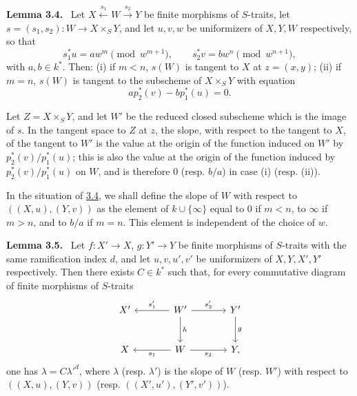 \documentclass[11pt]{article}
\newenvironment{statement}[1]{\par\medskip\noindent\textbf{#1.}\ }{\par\medskip}
\begin{document}
\label{sga5:IIIB:lemma:3.4}\begin{statement}{Lemma 3.4}
Let $X\xleftarrow{s_1}W\xrightarrow{s_2}Y$ be finite morphisms of $S$-traits, let $s=(s_1,s_2):W\to X\times_SY$, and let $u,v,w$ be uniformizers of $X,Y,W$ respectively, so that
\[
s_1^*u=aw^m\pmod {w^{m+1}},\qquad
s_2^*v=bw^n\pmod {w^{n+1}},
\]
with $a,b\in k^*$. Then: (i) if $m<n$, $s(W)$ is tangent to $X$ at $z=(x,y)$; (ii) if $m=n$, $s(W)$ is tangent to the subscheme of $X\times_SY$ with equation
\[
ap_2^*(v)-bp_1^*(u)=0.
\]
\end{statement}

Let $Z=X\times_SY$, and let $W'$ be the reduced closed subscheme which is the image of $s$. In the tangent space to $Z$ at $z$, the slope, with respect to the tangent to $X$, of the tangent to $W'$ is the value at the origin of the function induced on $W'$ by $p_2^*(v)/p_1^*(u)$; this is also the value at the origin of the function induced by $p_2^*(v)/p_1^*(u)$ on $W$, and is therefore $0$ (resp. $b/a$) in case (i) (resp. (ii)).

In the situation of \hyperref[sga5:IIIB:lemma:3.4]{3.4}, we shall define the slope of $W$ with respect to $((X,u),(Y,v))$ as the element of $k\cup\{\infty\}$ equal to $0$ if $m<n$, to $\infty$ if $m>n$, and to $b/a$ if $m=n$. This element is independent of the choice of $w$.

\label{sga5:IIIB:lemma:3.5}\begin{statement}{Lemma 3.5}
Let $f:X'\to X$, $g:Y'\to Y$ be finite morphisms of $S$-traits with the same ramification index $d$, and let $u,v,u',v'$ be uniformizers of $X,Y,X',Y'$ respectively. Then there exists $C\in k^*$ such that, for every commutative diagram of finite morphisms of $S$-traits
\[
\begin{tikzcd}[column sep=large,row sep=large]
X' & W' \arrow[l,"s'_1"'] \arrow[r,"s'_2"] \arrow[d,"h"] & Y' \arrow[d,"g"]\\
X & W \arrow[l,"s_1"] \arrow[r,"s_2"'] & Y ,
\end{tikzcd}
\]
one has $\lambda=C{\lambda'}^d$, where $\lambda$ (resp. $\lambda'$) is the slope of $W$ (resp. $W'$) with respect to $((X,u),(Y,v))$ (resp. $((X',u'),(Y',v'))$).
\end{statement}
\end{document}
